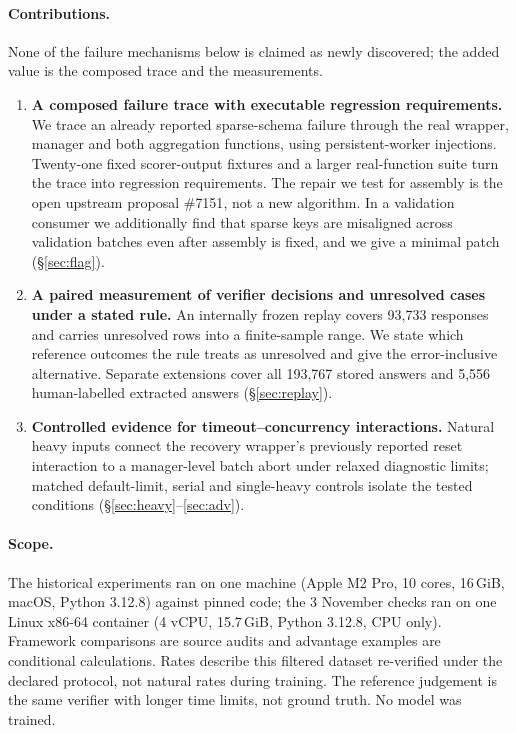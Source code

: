 \documentclass[11pt,a4paper]{article}
\newcommand{\pr}[1]{\#{#1}}
\begin{document}
\paragraph{Contributions.} None of the failure mechanisms below is claimed as newly discovered; the added value is the composed trace and the measurements.
\begin{enumerate}
\item \textbf{A composed failure trace with executable regression requirements.} We trace an already reported sparse-schema failure through the real wrapper, manager and both aggregation functions, using persistent-worker injections. Twenty-one fixed scorer-output fixtures and a larger real-function suite turn the trace into regression requirements. The repair we test for assembly is the open upstream proposal \pr{7151}, not a new algorithm. In a validation consumer we additionally find that sparse keys are misaligned across validation batches even after assembly is fixed, and we give a minimal patch (\S\ref{sec:flag}).
\item \textbf{A paired measurement of verifier decisions and unresolved cases under a stated rule.} An internally frozen replay covers 93,733 responses and carries unresolved rows into a finite-sample range. We state which reference outcomes the rule treats as unresolved and give the error-inclusive alternative. Separate extensions cover all 193,767 stored answers and 5,556 human-labelled extracted answers (\S\ref{sec:replay}).
\item \textbf{Controlled evidence for timeout--concurrency interactions.} Natural heavy inputs connect the recovery wrapper's previously reported reset interaction to a manager-level batch abort under relaxed diagnostic limits; matched default-limit, serial and single-heavy controls isolate the tested conditions (\S\ref{sec:heavy}--\ref{sec:adv}).
\end{enumerate}

\paragraph{Scope.} The historical experiments ran on one machine (Apple M2 Pro, 10 cores, 16\,GiB, macOS, Python 3.12.8) against pinned code; the 3 November checks ran on one Linux x86-64 container (4 vCPU, 15.7\,GiB, Python 3.12.8, CPU only). Framework comparisons are source audits and advantage examples are conditional calculations. Rates describe this filtered dataset re-verified under the declared protocol, not natural rates during training. The reference judgement is the same verifier with longer time limits, not ground truth. No model was trained.
\end{document}
